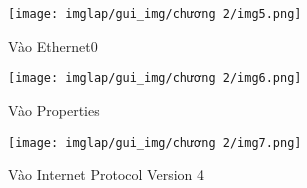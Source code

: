 \documentclass[13pt]{article}
\begin{document}
\begin{itemize}
\begin{itemize}
                            \begin{figure}[H]
                                \centering
                                \begin{minipage}{0.45\linewidth}
                                    \centering
                                    \texttt{[image: imglap/gui\_img/chương 2/img5.png]}
                                    \caption{Vào Ethernet0}
                                    \label{fig:enter-label1}
                                \end{minipage}
                                \hfill
                                \begin{minipage}{0.45\linewidth}
                                    \centering
                                    \texttt{[image: imglap/gui\_img/chương 2/img6.png]}
                                    \caption{Vào Properties}
                                    \label{fig:enter-label2}
                                \end{minipage}
                            \end{figure}

                            \begin{figure}[H]
                                \centering
                                \texttt{[image: imglap/gui\_img/chương 2/img7.png]}
                                \caption{Vào Internet Protocol Version 4}
                                \label{fig:enter-label}
                            \end{figure}
                        \end{itemize}
                \end{itemize}
                \newpage
\end{document}
